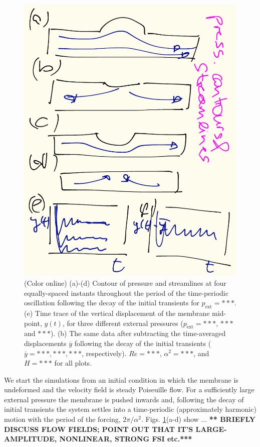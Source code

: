 \documentclass[aps,prl,reprint,superscriptaddress,floatfix]{revtex4-1}
\newcommand{\Rey}{\mathit{Re}}
\begin{document}
\begin{figure}
  \centering
\includegraphics[width=1.0\linewidth]{matthias_sketches/fig2.pdf}
\caption{\label{fig:flow_fields_and_displacement}
  (Color online)  (a)-(d) Contour of pressure
  and streamlines at four equally-spaced
  instants throughout the period of the time-periodic oscillation
  following the decay of the initial transients for
  $p_\text{ext}=***$. (e) Time trace of the vertical
  displacement of the membrane mid-point, $y(t)$, for three different 
  external pressures ($p_\text{ext}=***$, $***$
  and $***$). (b) The same data after subtracting the
  time-averaged displacements $\overline{y}$ following the decay of the
  initial transients ($\overline{y} = ***, ***, ***$,
  respectively). $\Rey=***$, $\alpha^2=***$, and
  $H=***$ for all plots.}
\end{figure}
We start the simulations from an initial condition in
which the membrane is undeformed and the velocity
field is steady Poiseuille flow. For a sufficiently large external
pressure the membrane is pushed inwards and, following 
the decay of initial transients the system settles into a
time-periodic (approximately harmonic) motion with the period of the
forcing, $2\pi/\alpha^2$. Figs. \ref{fig:flow_fields_and_displacement}(a-d)
show ... {\bf *** BRIEFLY DISCUSS FLOW FIELDS; POINT OUT THAT IT'S 
LARGE-AMPLITUDE, NONLINEAR, STRONG FSI etc.***}
\end{document}

